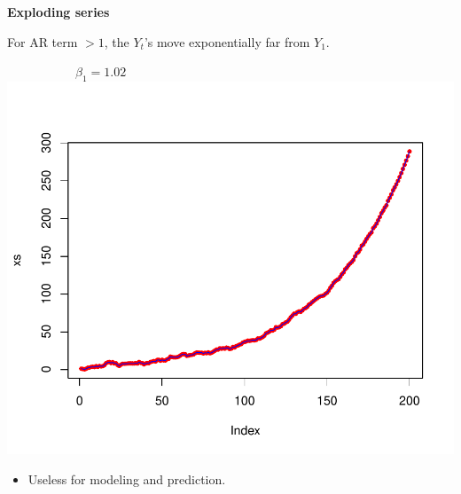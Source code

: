 \documentclass[12pt,xcolor=svgnames]{beamer}
\newcommand{\theme}{\color{FireBrick}}
\newcommand{\sk}{\vspace{.4cm}}
\newcommand{\chap}[1]{{\theme \Large \bf #1} \sk}
\begin{document}
\begin{frame}
\chap{Exploding series}

For AR term $>1$, the $Y_t$'s move exponentially far from $Y_1$.

\vspace{0.55cm}
\begin{minipage}{7cm}
\centering
\ \ \ \ \ \ \ \ \ \ \ $\beta_1 = 1.02$\\
\includegraphics[scale=0.55,trim=15 50 0 50]{exploding_new}
\sk
\end{minipage}\hfill
\begin{minipage}{3cm}
\begin{itemize}
\item Useless for modeling and prediction.
\end{itemize}
\end{minipage}
\end{frame}
\end{document}
